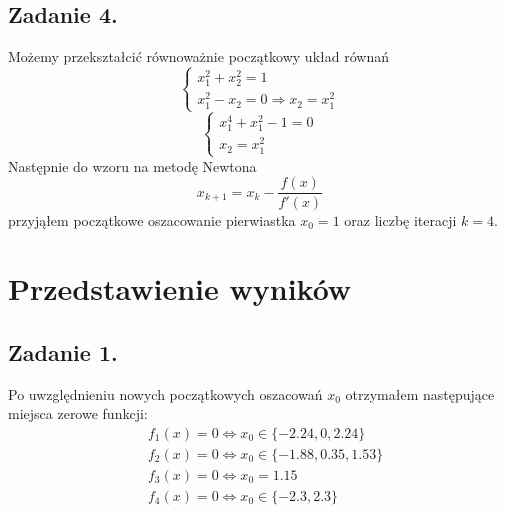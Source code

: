 \documentclass[11pt, leqno]{scrartcl}
\begin{document}
    \subsection{Zadanie 4.}
    Możemy przekształcić równoważnie początkowy układ równań
    \[
        \begin{cases}
            x_1^2+x_2^2 = 1 \\
            x_1^2-x_2 = 0 \Rightarrow x_2=x_1^2
        \end{cases}
    \]
    \[
        \begin{cases}
            x_1^4+x_1^2-1=0 \\
            x_2=x_1^2
        \end{cases}
    \]
    Następnie do wzoru na metodę Newtona
    \[
        x_{k+1}=x_k-\frac{f(x)}{f'(x)}
    \]
    przyjąłem początkowe oszacowanie pierwiastka $x_0=1$
    oraz liczbę iteracji $k=4$.

    \section{Przedstawienie wyników}
    \subsection{Zadanie 1.}
    Po uwzględnieniu nowych początkowych oszacowań $x_0$
    otrzymałem następujące miejsca zerowe funkcji:
    \begin{align*}
        &f_1(x)=0 \Leftrightarrow x_0\in \{-2.24,0,2.24\} \\
        &f_2(x)=0 \Leftrightarrow x_0\in \{-1.88,0.35,1.53\} \\
        &f_3(x)=0 \Leftrightarrow x_0=1.15 \\
        &f_4(x)=0 \Leftrightarrow x_0\in \{-2.3,2.3\}
    \end{align*}
\end{document}
